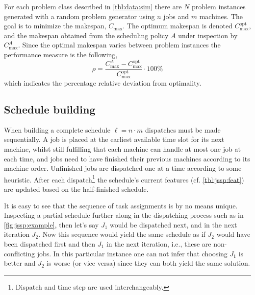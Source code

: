 \documentclass[smallextended]{svjour3}
\begin{document}
For each problem class described in \cref{tbl:data:sim} there are $N$ problem 
instances generated with a random problem generator using $n$ jobs and $m$ 
machines.  The goal is to minimize the makespan, $C_{\max}$. The optimum 
makespan is denoted $C_{\max}^{\text{opt}}$, and the makespan obtained from the 
scheduling policy $A$ under inspection by $C_{\max}^{A}$. Since the optimal 
makespan varies between problem instances the performance measure is the 
following,
\begin{equation}\label{eq:ratio}
    \rho=\frac{C_{\max}^{A}-C_{\max}^{\text{opt}}}{C_{\max}^{\text{opt}}}\cdot
  100\%
\end{equation}
which indicates the percentage relative deviation from optimality. %

\subsection{Schedule building}\label{sec:gen:gametree}
When building a complete schedule $\ell=n\cdot m$ dispatches must be made 
sequentially.  A job is placed at the earliest available time slot for its next 
machine, whilst still fulfilling that each machine can handle at most one job 
at each time, and jobs need to have finished their previous machines according 
to its machine order. Unfinished jobs are dispatched one at a time according to 
some heuristic. After each dispatch\footnote{Dispatch and time step are used 
interchangeably.} the schedule's current features (cf. \cref{tbl:jssp:feat}) 
are updated based on the half-finished schedule.

It is easy to see that the sequence of task assignments is by no means unique. 
Inspecting a partial schedule further along in the dispatching process such as 
in \cref{fig:jssp:example}, then let's say $J_1$ would be dispatched next, and 
in the next iteration $J_2$. Now this sequence would yield the same schedule as 
if $J_2$ would have been dispatched first and then $J_1$ in the next iteration, 
i.e., these are non-conflicting jobs.  In this particular instance one can not 
infer that choosing $J_1$ is better and $J_2$ is worse (or vice versa) since
they can both yield the same solution. 
\end{document}

